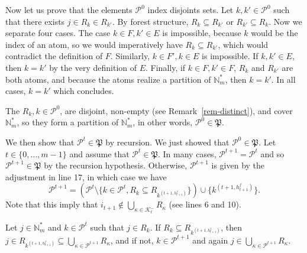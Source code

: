 \documentclass[
  11pt,
  a4paper,
]{article}
\theoremstyle{plain}
\theoremstyle{plain}
\theoremstyle{definition}
\theoremstyle{plain}
\theoremstyle{definition}
\theoremstyle{remark}
\begin{document}
Now let us prove that the elements \(\mathcal{P}^0\) index disjoints
sets. Let \(k, k'\in \mathcal{P}^0\) such that there exists
\(j\in R_{k}\in R_{k'}\). By forest structure, \(R_{k}\subseteq R_{k'}\)
or \(R_{k'}\subseteq R_{k}\). Now we separate four cases. The case
\(k\in F, k'\in E\) is impossible, because \(k\) would be the index of
an atom, so we would imperatively have \(R_{k}\subseteq R_{k'}\), which
would contradict the definition of \(F\). Similarly, \(k\in F', k\in E\)
is impossible. If \(k, k'\in E\), then \(k=k'\) by the very definition
of \(E\). Finally, if \(k\in F, k'\in F\), \(R_k\) and \(R_{k'}\) are
both atoms, and because the atoms realize a partition of
\(\mathbb{N}_m^*\), then \(k=k'\). In all cases, \(k=k'\) which
concludes.

The \(R_k, k\in \mathcal{P}^0\), are disjoint, non-empty (see
Remark~\ref{rem-distinct}), and cover \(\mathbb{N}_m^*\), so they form a
partition of \(\mathbb{N}_m^*\), in other words,
\(\mathcal{P}^0\in\mathfrak P\).

We then show that \(\mathcal{P}^t\in\mathfrak P\) by recursion. We just
showed that \(\mathcal{P}^0\in\mathfrak P\). Let
\(t\in\{ 0,\dotsc,m-1\}\) and assume that
\(\mathcal{P}^t\in\mathfrak P\). In many cases,
\(\mathcal{P}^{t+1}=\mathcal{P}^t\) and so
\(\mathcal{P}^{t+1}\in\mathfrak P\) by the recursion hypothesis.
Otherwise, \(\mathcal{P}^{t+1}\) is given by the adjustment in line 17,
in which case we have \begin{equation}\label{eq_rel_rec_p}
\mathcal{P}^{t+1}=\left(\mathcal{P}^t \setminus\{k\in\mathcal{P}^t, R_k\subseteq R_{  k^{(t+1,h^f_{t+1})}   }   \}  \right)\cup \{ k^{(t+1,h^f_{t+1})} \}.
\end{equation} Note that this imply that
\(i_{t+1}\not\in\bigcup_{\kappa \in \mathcal{K}^-_t} R_{\kappa}\) (see
lines 6 and 10).

Let \(j\in\mathbb{N}_m^*\) and \(k\in\mathcal{P}^t\) such that
\(j\in R_k\). If \(R_k\subseteq R_{  k^{(t+1,h^f_{t+1})}   }\), then
\(j\in R_{  k^{(t+1,h^f_{t+1})}   }\subseteq \bigcup_{\kappa\in \mathcal{P}^{t+1}} R_{\kappa}\),
and if not, \(k\in\mathcal{P}^{t+1}\) and again
\(j\in \bigcup_{\kappa\in \mathcal{P}^{t+1}} R_{\kappa}\).
\end{document}
